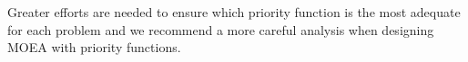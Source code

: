 Greater efforts are needed to ensure which priority function is the most adequate for each problem and we recommend a more careful analysis when designing MOEA with priority functions. 

%
